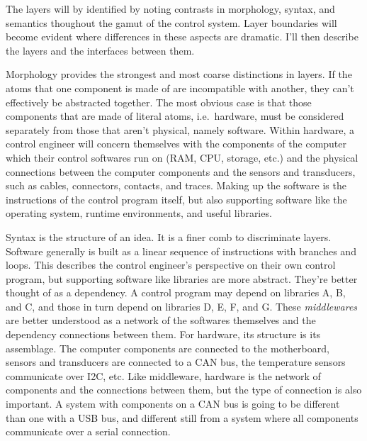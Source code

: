 \documentclass[english,12pt,a4paper,pdftex,eng,utf8]{aaltothesis}
\begin{document}
The layers will by identified by noting contrasts in morphology, syntax, and semantics thoughout the gamut of the control system.  Layer boundaries will become evident where differences in these aspects are dramatic.  I'll then describe the layers and the interfaces between them.

Morphology provides the strongest and most coarse distinctions in layers.  If the atoms that one component is made of are incompatible with another, they can't effectively be abstracted together.  The most obvious case is that those components that are made of literal atoms, i.e.\ hardware, must be considered separately from those that aren't physical, namely software.  Within hardware, a control engineer will concern themselves with the components of the computer which their control softwares run on (RAM, CPU, storage, etc.) and the physical connections between the computer components and the sensors and transducers, such as cables, connectors, contacts, and traces.  Making up the software is the instructions of the control program itself, but also supporting software like the operating system, runtime environments, and useful libraries.

Syntax is the structure of an idea.  It is a finer comb to discriminate layers.  Software generally is built as a linear sequence of instructions with branches and loops.  This describes the control engineer's perspective on their own control program, but supporting software like libraries are more abstract.  They're better thought of as a dependency.  A control program may depend on libraries A, B, and C, and those in turn depend on libraries D, E, F, and G.  These {\it middlewares\/} are better understood as a network of the softwares themselves and the dependency connections between them.  For hardware, its structure is its assemblage.  The computer components are connected to the motherboard, sensors and transducers are connected to a CAN bus, the temperature sensors communicate over I2C, etc.  Like middleware, hardware is the network of components and the connections between them, but the type of connection is also important.  A system with components on a CAN bus is going to be different than one with a USB bus, and different still from a system where all components communicate over a serial connection.
\end{document}
